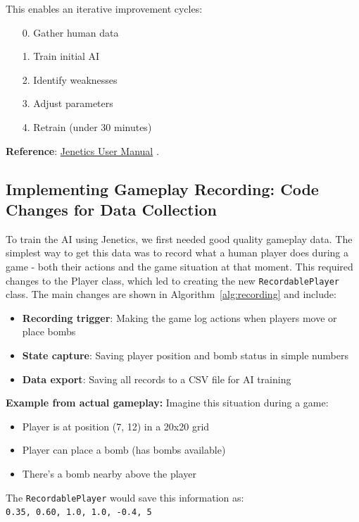 \documentclass[sigconf]{acmart} %
\begin{document}
This enables an iterative improvement cycles:
\begin{itemize}

    \item [0.] Gather human data
    \item [1.] Train initial AI
    \item [2.] Identify weaknesses
    \item [3.] Adjust parameters
    \item [4.] Retrain (under 30 minutes)
    

\end{itemize}
\noindent\textbf{Reference}: \href{https://jenetics.io/manual/manual-8.2.0.pdf}{Jenetics User Manual} \cite{jenetics2024}.
\subsection{Implementing Gameplay Recording: Code Changes for Data Collection}
\label{subsec:recording}

To train the AI using Jenetics, we first needed good quality gameplay data. The simplest way to get this data was to record what a human player does during a game - both their actions and the game situation at that moment. This required changes to the Player class, which led to creating the new \texttt{RecordablePlayer} class. The main changes are shown in Algorithm~\ref{alg:recording} and include:

\begin{itemize}
	\item \textbf{Recording trigger}: Making the game log actions when players move or place bombs
	\item \textbf{State capture}: Saving player position and bomb status in simple numbers
	\item \textbf{Data export}: Saving all records to a CSV file for AI training
\end{itemize}

\textbf{Example from actual gameplay:}
Imagine this situation during a game:
\begin{itemize}
	\item Player is at position (7, 12) in a 20x20 grid
	\item Player can place a bomb (has bombs available)
	\item There's a bomb nearby above the player
\end{itemize}

The \texttt{RecordablePlayer} would save this information as:\\
\texttt{0.35, 0.60, 1.0, 1.0, -0.4, 5}
\end{document}
